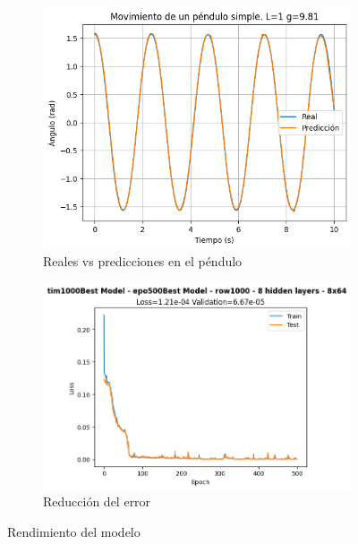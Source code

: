 \documentclass[a4paper,12pt]{article}
\begin{document}
\begin{figure}[H]
    \centering
    \begin{subfigure}{.7\linewidth}
        \centering
        \includegraphics[width=\textwidth]{true_vs_prediction_pendulum.png}
        \caption{Reales vs predicciones en el péndulo}
        \label{fig:true_vs_prediction_pendulum}
    \end{subfigure}
    \begin{subfigure}{.7\linewidth}
        \centering
        \includegraphics[width=\textwidth]{loss.png}
        \caption{Reducción del error}
        \label{fig:loss}
    \end{subfigure}
    \caption{Rendimiento del modelo}
\end{figure}
\end{document}
